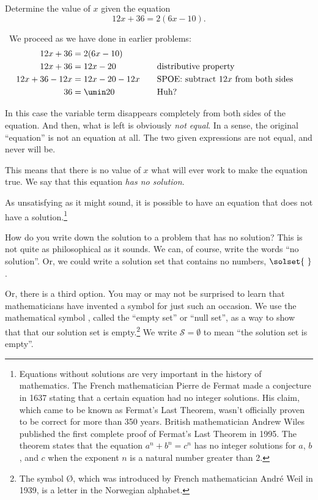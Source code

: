 \begin{boxedex}
Determine the value of $x$ given the equation \[12x + 36 = 2(6x-10).\]

\exsoln\ We proceed as we have done in earlier problems:
\[\begin{aligned}
12x + 36 &= 2(6x-10)\\
12x + 36 &= 12x-20
&&\text{\quad distributive property}\\
12x+36-12x &= 12x-20-12x
&&\text{\quad SPOE: subtract $12x$ from both sides}\\
36 &= \umin20
&&\text{\quad Huh?}\\
\end{aligned}\]

In this case the variable term disappears completely from both sides of the equation. And then, what is left is obviously \textit{not equal}. In a sense, the original ``equation'' is not an equation at all. The two given expressions are not equal, and never will be.

This means that there is no value of $x$ what will ever work to make the equation true. We say that this equation \textit{has no solution}.
\end{boxedex}

As unsatisfying as it might sound, it is possible to have an equation that does not have a solution.\footnote{Equations without solutions are very important in the history of mathematics. The French mathematician Pierre de Fermat made a conjecture in 1637 stating that a certain equation had no integer solutions. His claim, which came to be known as Fermat's Last Theorem, wasn't officially proven to be correct for more than 350 years. British mathematician Andrew Wiles published the first complete proof of Fermat's Last Theorem in 1995. The theorem states that the equation $a^n + b^n = c^n$ has no integer solutions for $a$, $b$, and $c$ when the exponent $n$ is a natural number greater than 2.}

How do you write down the solution to a problem that has no solution? This is not quite as philosophical as it sounds. We can, of course, write the words ``no solution''. Or, we could write a solution set that contains no numbers, $\solset{~}$.

Or, there is a third option. You may or may not be surprised to learn that mathematicians have invented a symbol for just such an occasion. We use the mathematical symbol \emptyset, called the ``empty set'' or ``null set'', as a way to show that that our solution set is empty.\footnote{The symbol \O, which was introduced by French mathematician Andr\'e Weil in 1939, is a letter in the Norwegian alphabet.} We write $\mathcal{S} = \emptyset$ to mean ``the solution set is empty''.

